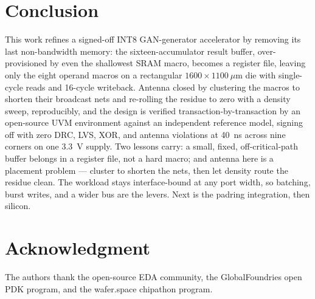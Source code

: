 \documentclass[conference,a4paper]{APSIPA2026}
\begin{document}
\section{Conclusion}\label{sec:concl}
This work refines a signed-off INT8 GAN-generator accelerator by removing its last non-bandwidth memory: the sixteen-accumulator result buffer, over-provisioned by even the shallowest SRAM macro, becomes a register file, leaving only the eight operand macros on a rectangular $1600\times1100~\mu$m die with single-cycle reads and 16-cycle writeback. Antenna closed by clustering the macros to shorten their broadcast nets and re-rolling the residue to zero with a density sweep, reproducibly, and the design is verified transaction-by-transaction by an open-source UVM environment against an independent reference model, signing off with zero DRC, LVS, XOR, and antenna violations at 40~ns across nine corners on one 3.3~V supply. Two lessons carry: a small, fixed, off-critical-path buffer belongs in a register file, not a hard macro; and antenna here is a placement problem --- cluster to shorten the nets, then let density route the residue clean. The workload stays interface-bound at any port width, so batching, burst writes, and a wider bus are the levers. Next is the padring integration, then silicon.

\section*{Acknowledgment}
The authors thank the open-source EDA community, the GlobalFoundries open PDK program, and the wafer.space chipathon program.
\end{document}

